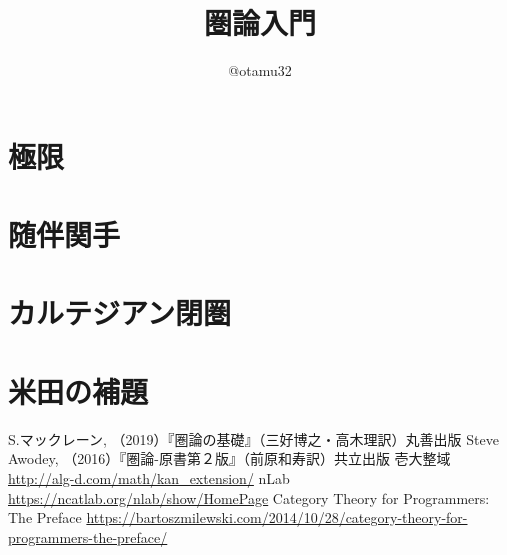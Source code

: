 \documentclass[uplatex,dvipdfmx]{jsarticle}
\begin{document}
	\title{圏論入門}
  \author{@otamu32}
	\maketitle
	\tableofcontents
	
  
  
	
  
  
	
	\section{極限}
	\section{随伴関手}
	\section{カルテジアン閉圏}
	\section{米田の補題}

	\begin{thebibliography}{99}
	 S.マックレーン, （2019）『圏論の基礎』（三好博之・高木理訳）丸善出版
	 Steve Awodey, （2016）『圏論-原書第２版』（前原和寿訳）共立出版
	 壱大整域 \url{http://alg-d.com/math/kan_extension/}
	 nLab \url{https://ncatlab.org/nlab/show/HomePage}
	 Category Theory for Programmers: The Preface \url{https://bartoszmilewski.com/2014/10/28/category-theory-for-programmers-the-preface/}
	\end{thebibliography}
\end{document}
